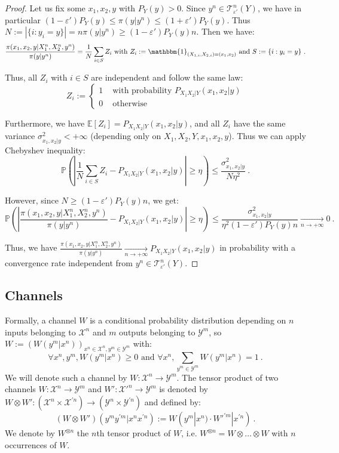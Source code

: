 \begin{proof}
        Let us fix some $x_1,x_2,y$ with $P_Y(y) > 0$. Since $y^n \in \mathcal{T}^n_{\varepsilon'}(Y)$, we have in particular $(1-\varepsilon')P_Y(y) \leq \pi(y|y^n) \leq (1+\varepsilon')P_Y(y)$. Thus $N := |\{i:y_i=y\}| = n\pi(y|y^n) \geq (1-\varepsilon')P_Y(y)n$. Then we have:
        \[ \frac{\pi(x_1,x_2,y|X_1^n,X_2^n,y^n)}{\pi(y|y^n)} = \frac{1}{N}\sum_{i \in S}Z_i \text{ with }Z_i := \mathbbm{1}_{(X_{1,i},X_{2,i})=(x_1,x_2)} \text{ and } S := \{i:y_i=y\}\ . \]

        Thus, all $Z_i$ with $i \in S$ are independent and follow the same law:      
          \[ Z_i := \begin{cases}
            1 & \text{ with probability } P_{X_1X_2|Y}(x_1,x_2|y) \\
            0 & \text{ otherwise}
          \end{cases}
          \]


          Furthermore, we have $\mathbb{E}[Z_i] = P_{X_1X_2|Y}(x_1,x_2|y)$, and all $Z_i$ have the same variance $\sigma_{x_1,x_2|y}^2 < +\infty$ (depending only on $X_1,X_2,Y,x_1,x_2,y$). Thus we can apply Chebyshev inequality:
          \[ \mathbb{P}\left( \left|\frac{1}{N}\sum_{i \in S} Z_i - P_{X_1X_2|Y}(x_1,x_2|y) \right| \geq \eta \right) \leq \frac{\sigma_{x_1,x_2|y}^2}{N\eta^2} \ .\]

          However, since $N \geq (1-\varepsilon')P_Y(y)n$, we get:
          \[ \mathbb{P}\left( \left|\frac{\pi(x_1,x_2,y|X_1^n,X_2^n,y^n)}{\pi(y|y^n)} - P_{X_1X_2|Y}(x_1,x_2|y) \right| \geq \eta \right) \leq \frac{\sigma_{x_1,x_2|y}^2}{\eta^2(1-\varepsilon')P_Y(y)n} \underset{n \rightarrow +\infty}{\rightarrow} 0 \ .\]

          Thus, we have $\frac{\pi(x_1,x_2,y|X_1^n,X_2^n,y^n)}{\pi(y|y^n)} \underset{n \rightarrow +\infty}{\rightarrow} P_{X_1X_2|Y}(x_1,x_2|y)$ in probability with a convergence rate independent from $y^n \in \mathcal{T}^n_{\varepsilon'}(Y)$.
      \end{proof}

\subsection{Channels}
Formally, a channel $W$ is a conditional probability distribution depending on $n$ inputs belonging to $\mathcal{X}^n$ and $m$ outputs belonging to $\mathcal{Y}^m$, so $W := \left(W(y^m|x^n)\right)_{x^n \in \mathcal{X}^n, y^m \in \mathcal{Y}^m}$ with:
  \[ \forall x^n,y^m, W(y^m|x^n) \geq 0 \text{ and } \forall x^n, \sum_{y^m \in \mathcal{Y}^m} W(y^m|x^n) = 1 \ . \]
We will denote such a channel by $W : \mathcal{X}^n \rightarrow \mathcal{Y}^m$. The tensor product of two channels $W: \mathcal{X}^n \rightarrow \mathcal{Y}^m$ and $W': \mathcal{X}'^n \rightarrow \mathcal{Y}^m$ is denoted by $W \otimes W' : (\mathcal{X}^n \times \mathcal{X}^{\prime n}) \to  (\mathcal{Y}^n \times \mathcal{Y}^{\prime n})$ and defined by:
\[ (W \otimes W')(y^my^{\prime m}|x^nx^{\prime n}) := W(y^m|x^n) \cdot W'^{\prime m}|x^{\prime n}) \ .\]
We denote by $W^{\otimes n}$ the $n$th tensor product of $W$, i.e. $W^{\otimes n} = W \otimes \ldots \otimes W$ with $n$ occurrences of $W$.

